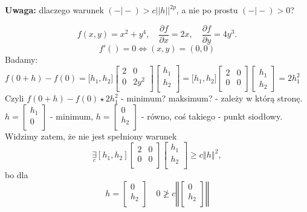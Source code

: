 \documentclass[../main.tex]{subfiles}
\begin{document}
\textbf{Uwaga:} dlaczego warunek $( - \big| - ) > c ||h||^{2p}$, a nie po prostu $( - \big| - ) > 0$?

\begin{przyklad}

    \[
        f(x,y) = x^2 + y^4,\quad \frac{\partial f}{\partial x} = 2x,\quad \frac{\partial f}{\partial y} = 4y^3
    .\]
\[
    f'() = 0 \iff (x,y) = (0,0)
\]
Badamy: $f(0+h) - f(0) = \big [ h_1, h_2 \big ] \left [ \begin{matrix}
2 &0\\
0 &2y^2\\
\end{matrix}\right ]
\left [ \begin{matrix}
h_1\\
h_2\\\end{matrix}\right ]
= \big [ h_1, h_2 \big ] \left [ \begin{matrix}
2 &0\\
0 &0\\ \end{matrix}\right ]
\left [ \begin{matrix} h_1\\
h_2\end{matrix}\right ] = 2h_1^2$
Czyli $f(0+h) - f(0) \star  2h_1^2$ - minimum? maksimum? - zależy w którą stronę.\\
$h = \left [ \begin{matrix}
h_1\\
0\\
\end{matrix}\right ] $ - minimum,
$h = \left [ \begin{matrix}
0\\
h_2\\
\end{matrix}\right ] $ - równo,
coś takiego - punkt siodłowy.\\
Widzimy zatem, że nie jest spełniony warunek
\[
    \underset{c}{\exists}\left[ h_1, h_2 \right ] \left[ \begin{matrix}
2 &0\\
0 &0\\
\end{matrix}\right ]
\left [ \begin{matrix}
h_1\\
h_2\\
    \end{matrix}\right ] \geq c \left\Vert h \right\Vert ^2
,\]
bo dla
\[
    h = \left [ \begin{matrix}
0\\
h_2\\
    \end{matrix}\right ] \quad 0 \not\geq c \left\Vert \left [ \begin{matrix}
0\\
h_2\\
\end{matrix}\right ] \right\Vert
\]
\end{przyklad}
\end{document}
